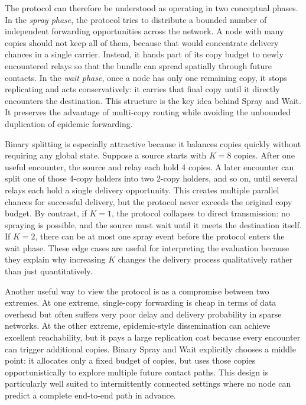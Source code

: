 The protocol can therefore be understood as operating in two conceptual phases. In the \emph{spray phase}, the protocol tries to distribute a bounded number of independent forwarding opportunities across the network. A node with many copies should not keep all of them, because that would concentrate delivery chances in a single carrier. Instead, it hands part of its copy budget to newly encountered relays so that the bundle can spread spatially through future contacts. In the \emph{wait phase}, once a node has only one remaining copy, it stops replicating and acts conservatively: it carries that final copy until it directly encounters the destination. This structure is the key idea behind Spray and Wait. It preserves the advantage of multi-copy routing while avoiding the unbounded duplication of epidemic forwarding.

Binary splitting is especially attractive because it balances copies quickly without requiring any global state. Suppose a source starts with $K{=}8$ copies. After one useful encounter, the source and relay each hold 4 copies. A later encounter can split one of those 4-copy holders into two 2-copy holders, and so on, until several relays each hold a single delivery opportunity. This creates multiple parallel chances for successful delivery, but the protocol never exceeds the original copy budget. By contrast, if $K{=}1$, the protocol collapses to direct transmission: no spraying is possible, and the source must wait until it meets the destination itself. If $K{=}2$, there can be at most one spray event before the protocol enters the wait phase. These edge cases are useful for interpreting the evaluation because they explain why increasing $K$ changes the delivery process qualitatively rather than just quantitatively.

Another useful way to view the protocol is as a compromise between two extremes. At one extreme, single-copy forwarding is cheap in terms of data overhead but often suffers very poor delay and delivery probability in sparse networks. At the other extreme, epidemic-style dissemination can achieve excellent reachability, but it pays a large replication cost because every encounter can trigger additional copies. Binary Spray and Wait explicitly chooses a middle point: it allocates only a fixed budget of copies, but uses those copies opportunistically to explore multiple future contact paths. This design is particularly well suited to intermittently connected settings where no node can predict a complete end-to-end path in advance.


